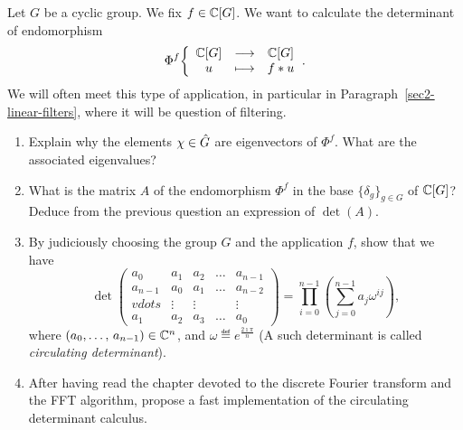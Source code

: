 \begin{exo}
\label{exo-determinant-circulating}

 Let $G$ be a cyclic group. We fix $f \in \mathbb{C}[G]$. We want to calculate the determinant of endomorphism
\begin{equation*}
\Phi^f {\left\{ \begin{array}{ccc} \mathbb{C}[G] & \longrightarrow & \mathbb{C}[G] \\ u & \longmapsto & f * u \end{array} \right.}.
\end{equation*}
We will often meet this type of application, in particular in Paragraph~\ref{sec2-linear-filters}, where it will be question of filtering. \begin{enumerate}
\item Explain why the elements $\chi \in \hat{G}$ are eigenvectors of $\Phi^f $. What are the associated eigenvalues?
\item What is the matrix $A$ of the endomorphism $\Phi^f $ in the base $\{\delta_g\}_{g \in G}$ of $\mathbb{C}[G]$? Deduce from the previous question an expression of $\det (A)$.
\item By judiciously choosing the group $G$ and the application $f$, show that we have
\begin{equation*}
\det \begin{pmatrix} a_0 & a_1 & a_2 & \ldots & a_{n-1} \\a_{n-1} & a_0 & a_1 & \ldots & a_{n-2} \\vdots & \vdots & \vdots & & \vdots \\a_1 & a_2 & a_3 & \ldots & a_{0} \end{pmatrix} = \prod_{i = 0}^{n-1} \left(\sum_{j = 0}^{n-1}{a_j} \omega^{ij} \right),
\end{equation*}
where $ (a_0, \ldots, \, a_{n-1}) \in \mathbb{C}^n $, and $\omega \eqdef e^{\frac{2 \imath \pi}{n}}$ (A such determinant is called \textit{circulating determinant}).
\item After having read the chapter  devoted to the discrete Fourier transform and the FFT algorithm, propose a fast implementation of the circulating determinant calculus.
\end{enumerate}
\end{exo}


